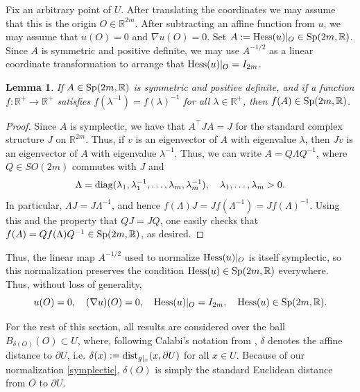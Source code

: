 \documentclass[11pt,reqno]{amsart}
\newcommand{\R}{\mathbb{R}}
\theoremstyle{plain}
\newtheorem{lemma}[theorem]{Lemma}
\theoremstyle{definition}
\numberwithin{equation}{section}
\begin{document}
Fix an arbitrary point of $U$. After translating the coordinates we may assume that this is the origin $O \in \mathbb{R}^{2m}$. After subtracting an affine function from $u$, we may assume that $u(O)=0$ and $\nabla u(O) = 0$. Set $A:={\rm Hess}(u)|_{O}\in {\rm Sp}(2m,\mathbb{R})$. Since $A$ is symmetric and positive definite, we may use $A^{-1/2}$ as a linear coordinate transformation to arrange that ${\rm Hess}(u)|_O = {I}_{2m}$.

\begin{lemma}
    If $A \in {\rm Sp}(2m,\mathbb{R})$ is symmetric and positive definite, and if a function $f: \mathbb{R}^+ \to \mathbb{R}^+$ satisfies $f(\lambda^{-1}) = f(\lambda)^{-1}$ for all $\lambda \in \mathbb{R}^+$, then $f(A) \in {\rm Sp}(2m,\mathbb{R})$.
\end{lemma}

\begin{proof}
    Since $A$ is symplectic, we have that $A^\top J A = J$ for the standard complex structure $J$ on $\mathbb{R}^{2m}$. Thus, if $v$ is an eigenvector of $A$ with eigenvalue $\lambda$, then $Jv$ is an eigenvector of $A$ with eigenvalue $\lambda^{-1}$. Thus, we can write $A = Q \Lambda Q^{-1}$, where $Q \in SO(2m)$ commutes with $J$ and $$\Lambda = {\rm diag}(\lambda_1,\lambda_1^{-1},\ldots, \lambda_m, \lambda_m^{-1}), \quad \lambda_1,\ldots,\lambda_m > 0.$$
In particular, $\Lambda J = J \Lambda^{-1}$, and hence 
$f(\Lambda)J = J f(\Lambda^{-1}) = J f(\Lambda)^{-1}$.
Using this and the property that $QJ = JQ$, one easily checks that $f(A) = Q f(\Lambda) Q^{-1} \in {\rm Sp}(2m,\mathbb{R})$, as desired.
\end{proof}

Thus, the linear map $A^{-1/2}$ used to normalize ${\rm Hess}(u)|_O$ is itself symplectic, so this normalization preserves the condition ${\rm Hess}(u) \in {\rm Sp}(2m,\mathbb{R})$ everywhere. Thus, without loss of generality,
\begin{equation}\label{symplectic}
u(O)=0, \quad (\nabla u)(O)=0, \quad  \operatorname{Hess}(u)|_{O}=I_{2m}, \quad \operatorname{Hess}(u)\in{\rm Sp}(2m,\R).
\end{equation}

For the rest of this section, all results are considered over the ball $B_{\delta(O)}(O)\subset U$, where, following Calabi's notation from \cite{EC}, $\delta$ denotes the affine distance to $\partial U$, i.e. $\delta(x) := {\rm dist}_{g|_x}(x,\partial U)$ for all $x \in U$. Because of our normalization \eqref{symplectic}, $\delta(O)$ is simply the standard Euclidean distance from $O$ to $\partial U$.
\end{document}
